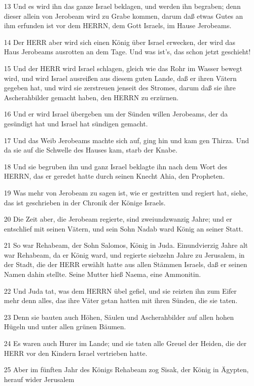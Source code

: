 \par 13 Und es wird ihn das ganze Israel beklagen, und werden ihn begraben; denn dieser allein von Jerobeam wird zu Grabe kommen, darum daß etwas Gutes an ihm erfunden ist vor dem HERRN, dem Gott Israels, im Hause Jerobeams.
\par 14 Der HERR aber wird sich einen König über Israel erwecken, der wird das Haus Jerobeams ausrotten an dem Tage. Und was ist's, das schon jetzt geschieht!
\par 15 Und der HERR wird Israel schlagen, gleich wie das Rohr im Wasser bewegt wird, und wird Israel ausreißen aus diesem guten Lande, daß er ihren Vätern gegeben hat, und wird sie zerstreuen jenseit des Stromes, darum daß sie ihre Ascherahbilder gemacht haben, den HERRN zu erzürnen.
\par 16 Und er wird Israel übergeben um der Sünden willen Jerobeams, der da gesündigt hat und Israel hat sündigen gemacht.
\par 17 Und das Weib Jerobeams machte sich auf, ging hin und kam gen Thirza. Und da sie auf die Schwelle des Hauses kam, starb der Knabe.
\par 18 Und sie begruben ihn und ganz Israel beklagte ihn nach dem Wort des HERRN, das er geredet hatte durch seinen Knecht Ahia, den Propheten.
\par 19 Was mehr von Jerobeam zu sagen ist, wie er gestritten und regiert hat, siehe, das ist geschrieben in der Chronik der Könige Israels.
\par 20 Die Zeit aber, die Jerobeam regierte, sind zweiundzwanzig Jahre; und er entschlief mit seinen Vätern, und sein Sohn Nadab ward König an seiner Statt.
\par 21 So war Rehabeam, der Sohn Salomos, König in Juda. Einundvierzig Jahre alt war Rehabeam, da er König ward, und regierte siebzehn Jahre zu Jerusalem, in der Stadt, die der HERR erwählt hatte aus allen Stämmen Israels, daß er seinen Namen dahin stellte. Seine Mutter hieß Naema, eine Ammonitin.
\par 22 Und Juda tat, was dem HERRN übel gefiel, und sie reizten ihn zum Eifer mehr denn alles, das ihre Väter getan hatten mit ihren Sünden, die sie taten.
\par 23 Denn sie bauten auch Höhen, Säulen und Ascherahbilder auf allen hohen Hügeln und unter allen grünen Bäumen.
\par 24 Es waren auch Hurer im Lande; und sie taten alle Greuel der Heiden, die der HERR vor den Kindern Israel vertrieben hatte.
\par 25 Aber im fünften Jahr des Königs Rehabeam zog Sisak, der König in Ägypten, herauf wider Jerusalem
